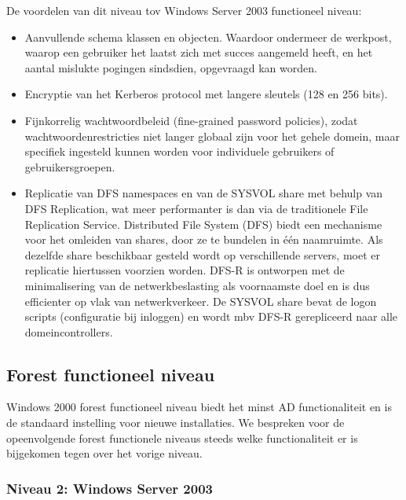 De voordelen van dit niveau tov Windows Server 2003 functioneel niveau:
\begin{itemize}
	\item Aanvullende schema klassen en objecten. Waardoor ondermeer de
		werkpost, waarop een gebruiker het laatst zich met succes aangemeld
		heeft, en het aantal mislukte pogingen sindsdien, opgevraagd
		kan worden.
	\item Encryptie van het Kerberos protocol met langere sleutels (128 en 256 bits). 
	\item Fijnkorrelig wachtwoordbeleid (fine-grained password policies),
		zodat wachtwoordenrestricties niet langer globaal zijn voor het
		gehele domein, maar specifiek ingesteld kunnen worden voor
		individuele gebruikers of gebruikersgroepen.
	\item Replicatie van DFS namespaces en van de SYSVOL share met behulp
		van DFS Replication, wat meer performanter is dan via de
		traditionele File Replication Service. Distributed File System
		(DFS) biedt een mechanisme voor het omleiden van shares, door ze
		te bundelen in één naamruimte. Als dezelfde share beschikbaar
		gesteld wordt op verschillende servers, moet er replicatie
		hiertussen voorzien worden. DFS-R is ontworpen met de
		minimalisering van de netwerkbeslasting als voornaamste doel en
		is dus efficienter op vlak van netwerkverkeer.
		De SYSVOL share bevat de logon scripts (configuratie bij
		inloggen) en wordt mbv DFS-R gerepliceerd naar alle
		domeincontrollers.
\end{itemize}

\subsection{Forest functioneel niveau}

Windows 2000 forest functioneel niveau biedt het minst AD functionaliteit en is
de standaard instelling voor nieuwe installaties. We bespreken voor de
opeenvolgende forest functionele niveaus steeds welke functionaliteit er is
bijgekomen tegen over het vorige niveau.

\subsubsection{Niveau 2: Windows Server 2003}

